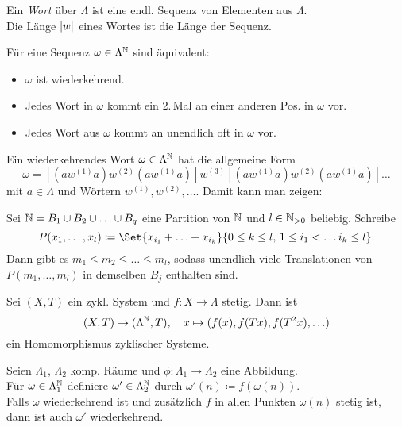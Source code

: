 \documentclass{cheat-sheet}
\begin{document}

\begin{defn}
  Ein \emph{Wort} über $\Lambda$ ist eine endl. Sequenz von Elementen aus $\Lambda$. \\
  Die Länge $\lvert w\rvert$ eines Wortes ist die Länge der Sequenz.
\end{defn}

\begin{prop}
  Für eine Sequenz $\omega \in \Lambda^{\mathbb{N}}$ sind äquivalent:
  \begin{itemize}
    \item $\omega$ ist wiederkehrend.
    \item Jedes Wort in $\omega$ kommt ein 2.\,Mal an einer anderen Pos. in $\omega$ vor.
    \item Jedes Wort aus $\omega$ kommt an unendlich oft in $\omega$ vor.
  \end{itemize}
\end{prop}

\begin{bem}
  Ein wiederkehrendes Wort $\omega \in \Lambda^{\mathbb{N}}$ hat die allgemeine Form
  \[ \omega = [(aw^{(1)}a)w^{(2)}(aw^{(1)}a)]w^{(3)}[(aw^{(1)}a)w^{(2)}(aw^{(1)}a)]\ldots \]
  mit $a \in \Lambda$ und Wörtern $w^{(1)}, w^{(2)}, \ldots$.
  Damit kann man zeigen:
\end{bem}

\begin{lem}[Hilbert]
  Sei $\mathbb{N} = B_1 \cup B_2 \cup \ldots \cup B_q$ eine Partition von $\mathbb{N}$ und $l \in \mathbb{N}_{>0}$ beliebig.
  Schreibe
  \[ P(x_1, \ldots, x_l) \coloneqq \Set{ x_{i_1} + \ldots + x_{i_k} }{0 \leq k \leq l, \, 1 \leq i_1 < \ldots i_k \leq l}. \]
  Dann gibt es $m_1 \leq m_2 \leq \ldots \leq m_l$, sodass unendlich viele Translationen von $P(m_1, \ldots, m_l)$ in demselben $B_j$ enthalten sind.
\end{lem}

\begin{bem}
  Sei $(X, T)$ ein zykl. System und $f : X \to \Lambda$ stetig. Dann ist
  \[
    (X, T) \to (\Lambda^{\mathbb{N}}, T), \quad
    x \mapsto (f(x), f(Tx), f(T^2x), \ldots)
  \]
  ein Homomorphismus zyklischer Systeme.

\end{bem}

\begin{thm}
  Seien $\Lambda_1$, $\Lambda_2$ komp. Räume und $\phi : \Lambda_1 \to \Lambda_2$ eine Abbildung. \\
  Für $\omega \in \Lambda_1^{\mathbb{N}}$ definiere $\omega' \in \Lambda_2^{\mathbb{N}}$ durch $\omega'(n) \coloneqq f(\omega(n))$. \\
  Falls $\omega$ wiederkehrend ist und zusätzlich $f$ in allen Punkten $\omega(n)$ stetig ist, dann ist auch $\omega'$ wiederkehrend.
\end{thm}
\end{document}
